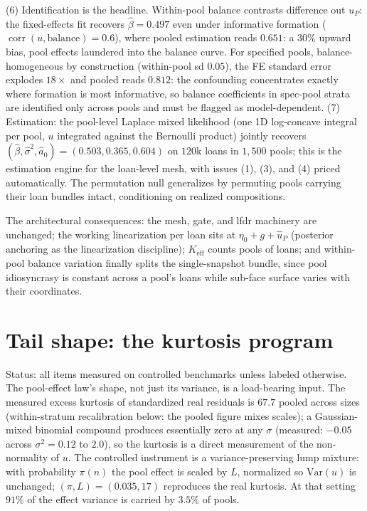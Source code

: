 \documentclass[11pt]{article}
\begin{document}
(6) Identification is the headline. Within-pool balance contrasts
difference out $u_P$: the fixed-effects fit recovers
$\hat\beta = 0.497$ even under informative formation
($\operatorname{corr}(u,\text{balance})=0.6$), where pooled estimation
reads $0.651$: a $30\%$ upward bias, pool effects laundered into the
balance curve. For specified pools, balance-homogeneous by construction
(within-pool sd $0.05$), the FE standard error explodes $18\times$ and
pooled reads $0.812$: the confounding concentrates exactly where
formation is most informative, so balance coefficients in spec-pool
strata are identified only across pools and must be flagged as
model-dependent. (7) Estimation: the pool-level Laplace mixed likelihood
(one 1D log-concave integral per pool, $u$ integrated against the
Bernoulli product) jointly recovers $(\hat\beta, \hat\sigma^2, \hat a_0)
= (0.503, 0.365, 0.604)$ on $120$k loans in $1{,}500$ pools; this is the
estimation engine for the loan-level mesh, with issues (1), (3), and (4)
priced automatically. The permutation null generalizes by permuting
pools carrying their loan bundles intact, conditioning on realized
compositions.

The architectural consequences: the mesh, gate, and lfdr machinery are
unchanged; the working linearization per loan sits at
$\eta_0 + g + \hat u_P$ (posterior anchoring as the linearization
discipline); $K_{\mathrm{eff}}$ counts pools of loans; and within-pool
balance variation finally splits the single-snapshot bundle, since pool
idiosyncrasy is constant across a pool's loans while sub-face surface
varies with their coordinates.


\section{Tail shape: the kurtosis program}\label{sec:kurtosis}

Status: all items measured on controlled benchmarks unless labeled
otherwise. The pool-effect law's shape, not just its variance, is a
load-bearing input. The measured excess kurtosis of standardized real
residuals is $67.7$ pooled across sizes (within-stratum recalibration
below: the pooled figure mixes scales); a Gaussian-mixed binomial compound produces
essentially zero at any $\sigma$ (measured: $-0.05$ across
$\sigma^2 = 0.12$ to $2.0$), so the kurtosis is a direct measurement of
the non-normality of $u$. The controlled instrument is a
variance-preserving lump mixture: with probability $\pi(n)$ the pool
effect is scaled by $L$, normalized so $\mathrm{Var}(u)$ is unchanged;
$(\pi, L) = (0.035, 17)$ reproduces the real kurtosis. At that setting
$91\%$ of the effect variance is carried by $3.5\%$ of pools.
\end{document}
